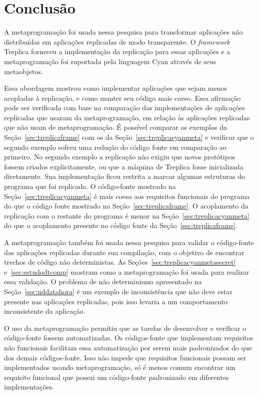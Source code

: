 \chapter*[Conclusão]{Conclusão}
\label{cap:conclusao}

A metaprogramação foi usada nessa pesquisa para transformar aplicações não distribuídas em aplicações replicadas de modo transparente. O \textit{framework} Treplica forneceu a implementação da replicação para essas aplicações e a metaprogramação foi suportada pela linguagem Cyan através de seus metaobjetos.

Essa abordagem mostrou como implementar aplicações que sejam menos acopladas à replicação, e como manter seu código mais coeso. Essa afirmação pode ser verificada com base na comparação das implementações de aplicações replicadas que usaram da metaprogramação, em relação às aplicações replicadas que não usam de metaprogramação. É possível comparar os exemplos da Seção~\ref{sec:treplicaframe} com os da Seção~\ref{sec:treplicacyanmeta} e verificar que o segundo exemplo sofreu uma redução do código fonte em comparação ao primeiro. No segundo exemplo a replicação não exigiu que novos protótipos fossem criados explicitamente, ou que a máquina de Treplica fosse inicializada diretamente. Sua implementação ficou restrita a marcar algumas estruturas do programa que foi replicado. O código-fonte mostrado na Seção~\ref{sec:treplicacyanmeta} é mais coeso aos requisitos funcionais do programa do que o código fonte mostrado na Seção~\ref{sec:treplicaframe}. O acoplamento da replicação com o restante do programa é menor na Seção~\ref{sec:treplicacyanmeta} do que o acoplamento presente no código fonte da Seção~\ref{sec:treplicaframe}.

A metaprogramação também foi usada nessa pesquisa para validar o código-fonte das aplicações replicadas durante sua compilação, com o objetivo de encontrar trechos de código não deterministas. As Seções~\ref{sec:treplicacyanmetasecret} e~\ref{sec:estudodtcomp} mostram como a metaprogramação foi usada para realizar essa validação. O problema de não determinismo apresentado na Seção~\ref{sec:nddatahora} é um exemplo de inconsistência que não deve estar presente nas aplicações replicadas, pois isso levaria a um comportamento inconsistente da aplicação.

O uso da metaprogramação permitiu que as tarefas de desenvolver e verificar o código-fonte fossem automatizadas. Os códigos-fonte que implementam requisitos não funcionais facilitam essa automatização por serem mais padronizados do que dos demais códigos-fonte. Isso não impede que requisitos funcionais possam ser implementados usando metaprogramação, só é menos comum encontrar um requisito funcional que possui um código-fonte padronizado em diferentes implementações.

